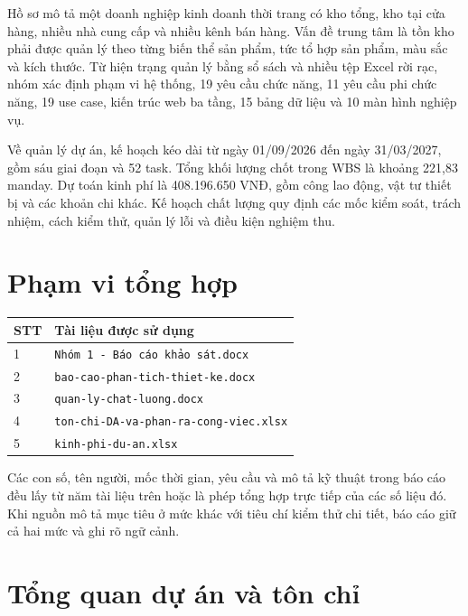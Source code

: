 \documentclass[12pt,a4paper]{report}
\newcommand{\tablehead}[1]{\cellcolor{HUSTBlue}\color{white}\textbf{#1}}
\begin{document}
Hồ sơ mô tả một doanh nghiệp kinh doanh thời trang có kho tổng, kho tại cửa hàng, nhiều nhà cung cấp và nhiều kênh bán hàng. Vấn đề trung tâm là tồn kho phải được quản lý theo từng biến thể sản phẩm, tức tổ hợp sản phẩm, màu sắc và kích thước. Từ hiện trạng quản lý bằng sổ sách và nhiều tệp Excel rời rạc, nhóm xác định phạm vi hệ thống, 19 yêu cầu chức năng, 11 yêu cầu phi chức năng, 19 use case, kiến trúc web ba tầng, 15 bảng dữ liệu và 10 màn hình nghiệp vụ.

Về quản lý dự án, kế hoạch kéo dài từ ngày 01/09/2026 đến ngày 31/03/2027, gồm sáu giai đoạn và 52 task. Tổng khối lượng chốt trong WBS là khoảng 221,83 manday. Dự toán kinh phí là 408.196.650 VNĐ, gồm công lao động, vật tư thiết bị và các khoản chi khác. Kế hoạch chất lượng quy định các mốc kiểm soát, trách nhiệm, cách kiểm thử, quản lý lỗi và điều kiện nghiệm thu.

\chapter*{Phạm vi tổng hợp}

\begin{tabularx}{\textwidth}{L{0.8cm}Y}
\toprule
\tablehead{STT} & \tablehead{Tài liệu được sử dụng}\\
 & \texttt{Nhóm 1 - Báo cáo khảo sát.docx}\\
2 & \texttt{bao-cao-phan-tich-thiet-ke.docx}\\
3 & \texttt{quan-ly-chat-luong.docx}\\
4 & \texttt{ton-chi-DA-va-phan-ra-cong-viec.xlsx}\\
5 & \texttt{kinh-phi-du-an.xlsx}\\
\bottomrule
\end{tabularx}

\vspace{0.4em}
Các con số, tên người, mốc thời gian, yêu cầu và mô tả kỹ thuật trong báo cáo đều lấy từ năm tài liệu trên hoặc là phép tổng hợp trực tiếp của các số liệu đó. Khi nguồn mô tả mục tiêu ở mức khác với tiêu chí kiểm thử chi tiết, báo cáo giữ cả hai mức và ghi rõ ngữ cảnh.

\tableofcontents
\listoftables
\listoffigures

\clearpage
{}

\chapter{Tổng quan dự án và tôn chỉ}
\end{document}
